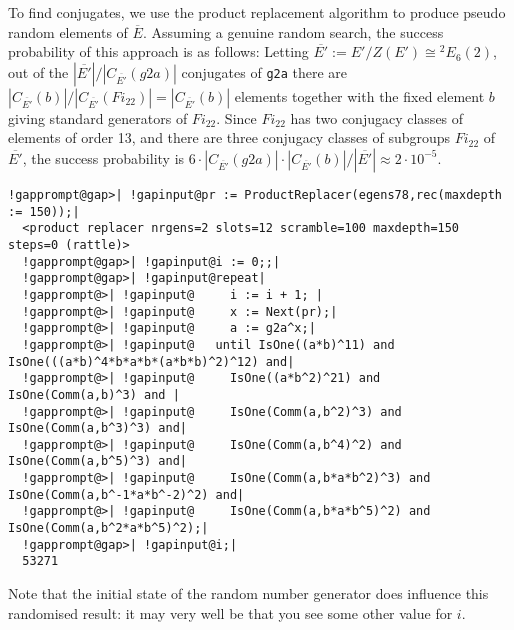 \documentclass[a4paper,11pt]{report}
\begin{document}
{{ To find conjugates, we use the product replacement algorithm to produce pseudo
random elements of $\overline{E}$. Assuming a genuine random search, the success probability of this approach
is as follows: Letting $\overline{E'}:=E'/Z(E') \cong {}^2E_6(2)$, out of the $|\overline{E'}|/|C_{\overline{E'}}(g2a)|$ conjugates of \texttt{g2a} there are $|C_{{ \overline{E'} }}(b)|/|C_{{ \overline{E'} }}(Fi_{{22}})| =|C_{{
\overline{E'} }}(b)|$ elements together with the fixed element $b$ giving standard generators of $Fi_{{22}}$. Since $Fi_{{22}}$ has two conjugacy classes of elements of order 13, and there are three
conjugacy classes of subgroups $Fi_{{22}}$ of $\overline{E'}$, the success probability is $6 \cdot |C_{{ \overline{E'} }}(g2a)| \cdot |C_{{ \overline{E'}
}}(b)|/|\overline{E'}| \approx 2 \cdot 10^{-5}$. 
\begin{Verbatim}[commandchars=!@|,fontsize=\small,frame=single,label=Example]
  !gapprompt@gap>| !gapinput@pr := ProductReplacer(egens78,rec(maxdepth := 150));|
  <product replacer nrgens=2 slots=12 scramble=100 maxdepth=150 steps=0 (rattle)>
  !gapprompt@gap>| !gapinput@i := 0;;|
  !gapprompt@gap>| !gapinput@repeat|
  !gapprompt@>| !gapinput@     i := i + 1; |
  !gapprompt@>| !gapinput@     x := Next(pr);|
  !gapprompt@>| !gapinput@     a := g2a^x;|
  !gapprompt@>| !gapinput@   until IsOne((a*b)^11) and IsOne(((a*b)^4*b*a*b*(a*b*b)^2)^12) and|
  !gapprompt@>| !gapinput@     IsOne((a*b^2)^21) and IsOne(Comm(a,b)^3) and |
  !gapprompt@>| !gapinput@     IsOne(Comm(a,b^2)^3) and IsOne(Comm(a,b^3)^3) and|
  !gapprompt@>| !gapinput@     IsOne(Comm(a,b^4)^2) and IsOne(Comm(a,b^5)^3) and|
  !gapprompt@>| !gapinput@     IsOne(Comm(a,b*a*b^2)^3) and IsOne(Comm(a,b^-1*a*b^-2)^2) and|
  !gapprompt@>| !gapinput@     IsOne(Comm(a,b*a*b^5)^2) and IsOne(Comm(a,b^2*a*b^5)^2);|
  !gapprompt@gap>| !gapinput@i;|
  53271 
\end{Verbatim}
   

 Note that the initial state of the random number generator does influence this
randomised result: it may very well be that you see some other value for $i$. 

}}
\end{document}
